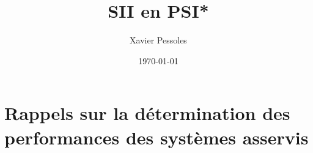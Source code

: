 \documentclass[
	fontsize=10pt, %
	twoside=true, %
]{kaobook}
\newcommand{\repRel}{../../..}
\newcommand{\repStyle}{\repRel/Style}
\begin{document}

\titlehead{Document Template}
\title[SII en PSI*]{SII en PSI*}
\author[XP]{Xavier Pessoles}
\date{\today}

%
\frontmatter %
%

%

%
\mainmatter %



\setcounter{margintocdepth}{\sectiontocdepth}
\marginlayout
\graphicspath{{\repStyle/png}}

\pagestyle{xp.scrheadings}


%



\newcommand{\repExo}{Application_01_ROV}
\newcommand{\nomExo}{Application_01_ROV}

\livrettrue %
\collefalse

\setcounter{chapter}{1}
%
%
\setchapterpreamble[u]{\margintoc}
\dominitoc
\chapter{Rappels sur la détermination des performances des systèmes asservis}
\minitoc



%
%
\end{document}

